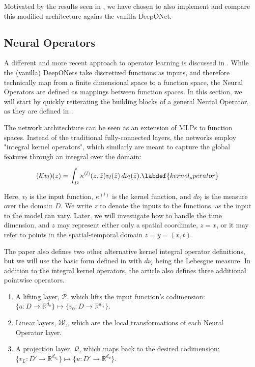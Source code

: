 Motivated by the results seen in \cite{wangImprovedArchitecturesTraining2022a}, we have chosen to also implement and compare this modified architecture agains the vanilla DeepONet.

\subsection{Neural Operators}

A different and more recent approach to operator learning is discussed in .
While the (vanilla) DeepONets take discretized functions as inputs, and therefore technically map from a finite dimensional space to a 
function space, the Neural Operators are defined as mappings between function spaces. In this section, we will start by quickly reiterating
the building blocks of a general Neural Operator, as they are defined in \cite{kovachkiNeuralOperatorLearning2024}.

The network architechture can be seen as an extension of MLPs to function spaces. Instead of the traditional fully-connected layers, 
the networks employ "integral kernel operators", which similarly are meant to capture the global features through an integral over the domain:

\begin{definition}
    \begin{equation}
        (\mathcal{K}v_l)(z) = \int_D \kappa^{(l)}(z,\bar{z}) v_l(\bar{z}) \, d \nu_l(\bar{z}). 
        \labdef{kernel_operator}
    \end{equation}
\end{definition}

Here, \(v_l\) is the input function, \(\kappa^{(l)}\) is the kernel function, and \(d \nu_l\) is the measure over the domain \(D\).
We write \(z\) to denote the inputs to the functions, as the input to the model can vary. Later, we will investigate how to handle the time dimension, and
\(z\) may represent either only a spatial coordinate, \(z=x\), or it may refer to points in the spatial-temporal domain \(z=y=(x,t)\).

The paper also defines two other alternative kernel integral operator definitions, but we will use the basic form defined in  with \( d \nu_l\) being the Lebesgue measure.
In addition to the integral kernel operators, the article also defines three additional pointwise operators.

\begin{enumerate}
    \item A lifting layer, \(\mathcal{P}\), which lifts the input function's codimension: \(\{a : D \to \mathbb{R}^{d_a}\} \mapsto \{v_0 : D \to \mathbb{R}^{d_{v_0}}\}\).
    \item Linear layers, \(\mathcal{W}_l\), which are the local transformations of each Neural Operator layer.
    \item A projection layer, \(\mathcal{Q}\), which maps back to the desired codimension: \(\{v_L : D' \to \mathbb{R}^{d_{v_L}}\} \mapsto \{u : D' \to \mathbb{R}^{d_u}\}\).
\end{enumerate}


